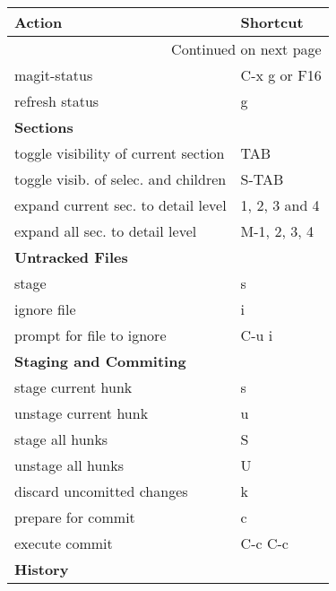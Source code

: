 \documentclass[english]{rcalibrionecolumn}
\begin{document}
\begin{longtable}{ll}

 \textbf{Action}                            &  \textbf{Shortcut} \\
\hline
\endhead
\hline\multicolumn{2}{r}{Continued on next page}\
\endfoot
\endlastfoot
 magit-init                                 &  F17                \\
 magit-status                               &  C-x g or F16       \\
 refresh status                             &  g                  \\
 \textbf{Sections}                          &                     \\
\hline
 toggle visibility of current section       &  TAB                \\
 toggle visib. of selec. and children       &  S-TAB              \\
 expand current sec. to detail level        &  1, 2, 3 and 4      \\
 expand all sec. to detail level            &  M-1, 2, 3, 4       \\
\hline
 \textbf{Untracked Files}                   &                     \\
 stage                                      &  s                  \\
 ignore file                                &  i                  \\
 prompt for file to ignore                  &  C-u i              \\
\hline
 \textbf{Staging and Commiting}             &                     \\
 stage current hunk                         &  s                  \\
 unstage current hunk                       &  u                  \\
 stage all hunks                            &  S                  \\
 unstage all hunks                          &  U                  \\
 discard uncomitted changes                 &  k                  \\
 prepare for commit                         &  c                  \\
 execute commit                             &  C-c C-c            \\
\hline
 \textbf{History}                           &                     \\

\end{longtable}
\end{document}
